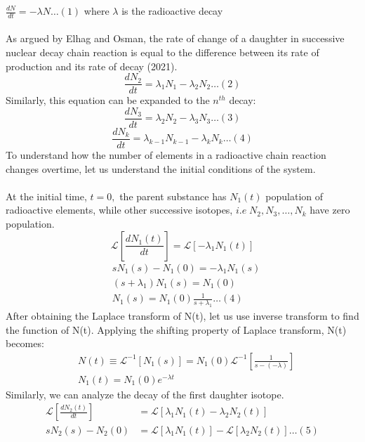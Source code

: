 \documentclass[12pt]{article}
\theoremstyle{plain}
\theoremstyle{definition}
\begin{document}
 $\frac{dN}{dt} = -\lambda N  \dots(1)$ \hspace{1 cm}where $\lambda$ is the radioactive decay 
\\
\\
As argued by Elhag and Osman, the rate of change of a daughter in successive nuclear decay chain reaction is equal to the difference between its rate of production and its rate of decay (2021).
\begin{equation*}
\frac{dN_2}{dt} = \lambda_1N_1 - \lambda_2N_2 \dots(2)
\end{equation*}
Similarly, this equation can be expanded to the $n^{th}$ decay:\\
\begin{equation*}
\frac{dN_3}{dt} = \lambda_{2}N_{2} - \lambda_3 N_3\dots(3)
\end{equation*}
\begin{equation*}
\frac{dN_k}{dt} = \lambda_{k-1}N_{k-1} - \lambda_kN_k\dots(4)
\end{equation*}
To understand how the number of elements in a radioactive chain reaction changes overtime, let us understand the initial conditions of the system.\\ \\
At the initial time, $t = 0,$ the parent substance has $N_1(t)$ population of radioactive elements, while other successive isotopes, $i.e \; N_2,N_3, \dots,N_k$ have zero population. 
\begin{equation*}
\mathcal{L}[\frac{dN_1(t)}{dt}] = \mathcal{L}[-\lambda_1 N_1(t)]
\end{equation*}
\begin{align*}
&sN_1(s) - N_1(0) = -\lambda_1 N_1(s)\\
&(s+\lambda_1)N_1(s) = N_1(0)\\
&N_1(s) = N_1(0)\frac{1}{s+\lambda_1}\dots(4)
\end{align*}
After obtaining the Laplace transform of N(t), let us use inverse transform to find the function of N(t). Applying the shifting property of Laplace transform, N(t) becomes:
\begin{align*}
&N(t)\equiv\mathcal{L}^{-1}[N_1(s)] = N_1(0)\mathcal{L}^{-1}[\frac{1}{s - (-\lambda)}]\\
&N_1(t) = N_1(0) e^{-\lambda t}
\end{align*}
Similarly, we can analyze the decay of the first daughter isotope.
\begin{align*}
\mathcal{L}[\frac{dN_2(t)}{dt}] &= \mathcal{L}[\lambda_1N_1(t) -\lambda_2N_2(t)]\\
sN_2(s) - N_2(0) &= \mathcal{L}[\lambda_1N_1(t)] -\mathcal{L} [\lambda_2N_2(t)]\dots(5)\\
\end{align*}
\end{document}
